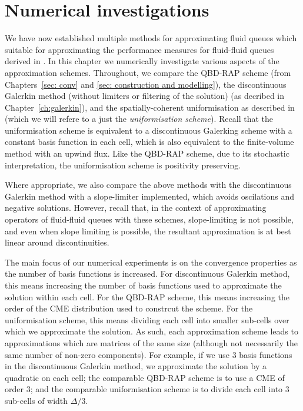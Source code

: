 \chapter{Numerical investigations\label{sec: numerics}}
We have now established multiple methods for approximating fluid queues which suitable for approximating the performance measures for fluid-fluid queues derived in \cite{bo2014}. In this chapter we numerically investigate various aspects of the approximation schemes. Throughout, we compare the QBD-RAP scheme (from Chapters~\ref{sec: conv} and \ref{sec: construction and modelling}), the discontinuous Galerkin method (without limiters or filtering of the solution) (as decribed in Chapter~\ref{ch:galerkin}), and the spatially-coherent uniformisation as described in \cite{bo2013} (which we will refere to a just the \emph{uniformisation scheme}). Recall that the uniformisation scheme is equivalent to a discontinuous Galerking scheme with a constant basis function in each cell, which is also equivalent to the finite-volume method with an upwind flux. Like the QBD-RAP scheme, due to its stochastic interpretation, the uniformisation scheme is positivity preserving. 


Where appropriate, we also compare the above methods with the discontinuous Galerkin method with a slope-limiter implemented, which avoids oscilations and negative solutions. However, recall that, in the context of approximating operators of fluid-fluid queues with these schemes, slope-limiting is not possible, and even when slope limiting is possible, the resultant approximation is at best linear around discontinuities. 

The main focus of our numerical experiments is on the convergence properties as the number of basis functions is increased. For discontinuous Galerkin method, this means increasing the number of basis functions used to approximate the solution within each cell. For the QBD-RAP scheme, this means increasing the order of the CME distribution used to constrcut the scheme. For the uniformisation scheme, this means dividing each cell into smaller sub-cells over which we approximate the solution. As such, each approximation scheme leads to approximations which are matrices of the same size (although not necessarily the same number of non-zero components). For example, if we use 3 basis functions in the discontinuous Galerkin method, we approximate the solution by a quadratic on each cell; the comparable QBD-RAP scheme is to use a CME of order 3; and the comparable uniformisation scheme is to divide each cell into 3 sub-cells of width \(\Delta/3\). 

